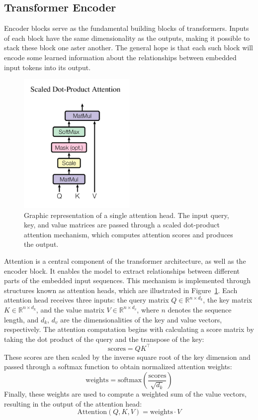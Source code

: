 \documentclass{pracalicmgr}
\begin{document}
\subsection{Transformer Encoder}

Encoder blocks serve as the fundamental building blocks of transformers. Inputs of each block have the same dimensionality as the outputs, making it possible to stack these block one aster another. The general hope is that each such block will encode some learned information about the relationships between embedded input tokens into its output.


\begin{figure}[h]
    \centering
    \includegraphics[width=0.5\textwidth]{src/scaledDotProd.png}
    \caption{Graphic representation of a single attention head. The input query, key, and value matrices are passed through a scaled dot-product attention mechanism, which computes attention scores and produces the output.\cite{Vaswani2017Attention}}
    \label{fig:singleAttentionHead}
\end{figure}

Attention is a central component of the transformer architecture, as well as the encoder block. It enables the model to extract relationships between different parts of the embedded input sequences. This mechanism is implemented through structures known as attention heads, which are illustrated in Figure~\ref{fig:singleAttentionHead}. Each attention head receives three inputs: the query matrix \( Q \in \mathbb{R}^{n \times d_k} \), the key matrix \( K \in \mathbb{R}^{n \times d_k} \), and the value matrix \( V \in \mathbb{R}^{n \times d_v} \), where \( n \) denotes the sequence length, and \( d_k \), \( d_v \) are the dimensionalities of the key and value vectors, respectively. The attention computation begins with calculating a score matrix by taking the dot product of the query and the transpose of the key: 
\[
\text{scores} = QK^\top
\]
These scores are then scaled by the inverse square root of the key dimension and passed through a softmax function to obtain normalized attention weights:
\[
\text{weights} = \text{softmax}\left(\frac{\text{scores}}{\sqrt{d_k}}\right)
\]
Finally, these weights are used to compute a weighted sum of the value vectors, resulting in the output of the attention head:
\[
\text{Attention}(Q, K, V) = \text{weights} \cdot V
\]
\end{document}
